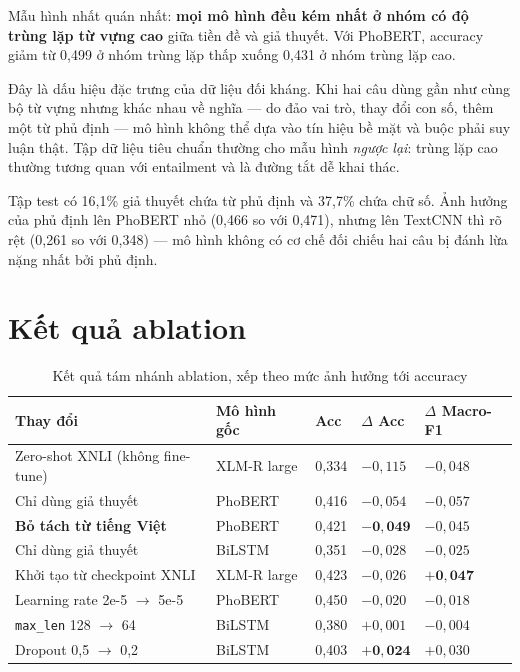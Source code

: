 \documentclass[12pt,a4paper,oneside]{report}
\begin{document}
Mẫu hình nhất quán nhất: \textbf{mọi mô hình đều kém nhất ở nhóm có độ trùng lặp từ vựng
cao} giữa tiền đề và giả thuyết. Với PhoBERT, accuracy giảm từ 0,499 ở nhóm trùng lặp thấp
xuống 0,431 ở nhóm trùng lặp cao.

Đây là dấu hiệu đặc trưng của dữ liệu đối kháng. Khi hai câu dùng gần như cùng bộ từ vựng
nhưng khác nhau về nghĩa --- do đảo vai trò, thay đổi con số, thêm một từ phủ định --- mô
hình không thể dựa vào tín hiệu bề mặt và buộc phải suy luận thật. Tập dữ liệu tiêu chuẩn
thường cho mẫu hình \textit{ngược lại}: trùng lặp cao thường tương quan với entailment và
là đường tắt dễ khai thác.

Tập test có 16,1\% giả thuyết chứa từ phủ định và 37,7\% chứa chữ số. Ảnh hưởng của phủ
định lên PhoBERT nhỏ (0,466 so với 0,471), nhưng lên TextCNN thì rõ rệt (0,261 so với
0,348) --- mô hình không có cơ chế đối chiếu hai câu bị đánh lừa nặng nhất bởi phủ định.

\section{Kết quả ablation}

\begin{table}[H]
\centering
\small
\caption{Kết quả tám nhánh ablation, xếp theo mức ảnh hưởng tới accuracy}
\begin{tabularx}{\textwidth}{@{}L{4.3cm}L{2.6cm}C{1.5cm}C{1.5cm}C{1.9cm}@{}}
\toprule
\textbf{Thay đổi} & \textbf{Mô hình gốc} & \textbf{Acc} &
\textbf{$\Delta$ Acc} & \textbf{$\Delta$ Macro-F1} \\
\midrule
Zero-shot XNLI (không fine-tune) & XLM-R large & 0,334 & $-0{,}115$ & $-0{,}048$ \\
Chỉ dùng giả thuyết              & PhoBERT     & 0,416 & $-0{,}054$ & $-0{,}057$ \\
\textbf{Bỏ tách từ tiếng Việt}   & PhoBERT     & 0,421 & $\mathbf{-0{,}049}$ &
                                   $-0{,}045$ \\
Chỉ dùng giả thuyết              & BiLSTM      & 0,351 & $-0{,}028$ & $-0{,}025$ \\
Khởi tạo từ checkpoint XNLI      & XLM-R large & 0,423 & $-0{,}026$ &
                                   $\mathbf{+0{,}047}$ \\
Learning rate 2e-5 $\rightarrow$ 5e-5 & PhoBERT & 0,450 & $-0{,}020$ & $-0{,}018$ \\
\texttt{max\_len} 128 $\rightarrow$ 64 & BiLSTM & 0,380 & $+0{,}001$ & $-0{,}004$ \\
Dropout 0,5 $\rightarrow$ 0,2    & BiLSTM      & 0,403 & $\mathbf{+0{,}024}$ &
                                   $+0{,}030$ \\
\bottomrule
\end{tabularx}
\end{table}
\end{document}
